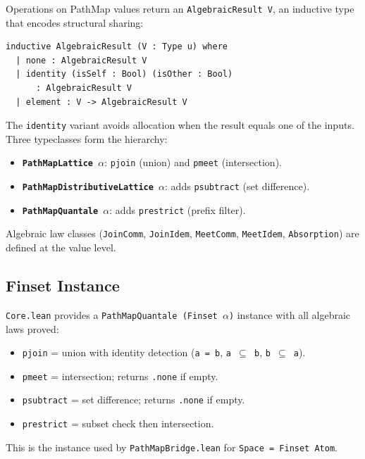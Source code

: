 \documentclass[11pt]{article}
\theoremstyle{definition}
\theoremstyle{remark}
\newcommand{\PathMap}{\textup{PathMap}}
\begin{document}
Operations on \PathMap{} values return an \texttt{AlgebraicResult\,V}, an
inductive type that encodes structural sharing:

\begin{lstlisting}[caption={\texttt{AlgebraicResult} (\texttt{Core.lean}).}]
inductive AlgebraicResult (V : Type u) where
  | none : AlgebraicResult V
  | identity (isSelf : Bool) (isOther : Bool)
      : AlgebraicResult V
  | element : V -> AlgebraicResult V
\end{lstlisting}

\noindent
The \texttt{identity} variant avoids allocation when the result equals one
of the inputs.
Three typeclasses form the hierarchy:

\begin{itemize}[nosep]
  \item \textbf{\texttt{PathMapLattice\,$\alpha$}}: \texttt{pjoin} (union)
    and \texttt{pmeet} (intersection).
  \item \textbf{\texttt{PathMapDistributiveLattice\,$\alpha$}}: adds
    \texttt{psubtract} (set difference).
  \item \textbf{\texttt{PathMapQuantale\,$\alpha$}}: adds \texttt{prestrict}
    (prefix filter).
\end{itemize}

\noindent
Algebraic law classes (\texttt{JoinComm}, \texttt{JoinIdem},
\texttt{MeetComm}, \texttt{MeetIdem}, \texttt{Absorption}) are defined at
the value level.

\subsection{Finset Instance}

\texttt{Core.lean} provides a \texttt{PathMapQuantale (Finset\,$\alpha$)}
instance with all algebraic laws proved:

\begin{itemize}[nosep]
  \item \texttt{pjoin} = union with identity detection (\texttt{a = b},
    \texttt{a $\subseteq$ b}, \texttt{b $\subseteq$ a}).
  \item \texttt{pmeet} = intersection; returns \texttt{.none} if empty.
  \item \texttt{psubtract} = set difference; returns \texttt{.none} if empty.
  \item \texttt{prestrict} = subset check then intersection.
\end{itemize}

\noindent
This is the instance used by \texttt{PathMapBridge.lean} for
\texttt{Space = Finset Atom}.
\end{document}
